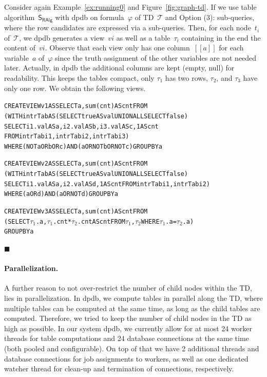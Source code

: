 \documentclass{llncs}
\newcommand{\cid}[1]{\ensuremath{[\![#1]\!]}}
\newcommand{\dpdb}{{\small\textsf{dpdb}}\xspace}
\newcommand{\tab}[1]{\ensuremath{\tau_{#1}}}
\renewenvironment{example}{\begin{EXa}}{\hfill\ensuremath{\blacksquare}\end{EXa}}
\begin{document}
\begin{example}\label{ex:dbviews}
Consider again Example~\ref{ex:running0} and Figure~\ref{fig:graph-td}.
If we use table algorithm~$\mathsf{S_{RAlg}}$ with \dpdb on formula~$\varphi$ of TD~$\mathcal{T}$ and Option (3): sub-queries, where the row candidates are expressed via a sub-queries. Then, for each node~$t_i$ of~$\mathcal{T}$, we \dpdb generates a view~$vi$ 
as well as a table~$\tab{i}$ containing in the end the content of~$vi$.
Observe that each view only has one column~$\cid{a}$ for each variable~$a$ of~$\varphi$ since the
truth assignment of the other variables are not needed later.
Actually, in \dpdb the additional columns are kept (empty, null) for readability.
This keeps the tables compact, only $\tab{1}$ has two rows, $\tab{2}$, and $\tab{3}$ have only one row.
We obtain the following views.
%
\begin{alltt}\small
CREATE VIEW v1 AS SELECT a, sum(cnt) AS cnt FROM 
 (WITH intrTab AS (SELECT true AS val UNION ALL SELECT false)
   SELECT i1.val AS a, i2.val AS b, i3.val AS c, 1 AS cnt 
          FROM intrTab i1, intrTab i2, intrTab i3)  
WHERE (NOT a OR b OR c) AND (a OR NOT b OR NOT c) GROUP BY a

CREATE VIEW v2 AS SELECT a, sum(cnt) AS cnt FROM 
 (WITH intrTab AS (SELECT true AS val UNION ALL SELECT false) 
   SELECT i1.val AS a, i2.val AS d, 1 AS cnt FROM intrTab i1, intrTab i2) 
WHERE (a OR d) AND (a OR NOT d) GROUP BY a

CREATE VIEW v3 AS SELECT a, sum(cnt) AS cnt FROM 
 (SELECT \ensuremath{\tab{1}}.a, \ensuremath{\tab{1}}.cnt * \ensuremath{\tab{2}}.cnt AS cnt FROM \ensuremath{\tab{1}}, \ensuremath{\tab{2}} WHERE \ensuremath{\tab{1}}.a = \ensuremath{\tab{2}}.a)
GROUP BY a\end{alltt}%
\vspace{-2em}
\end{example}%


\paragraph*{Parallelization.} A further reason to not over-restrict the number of child nodes within the TD, lies in parallelization.
In \dpdb, we compute tables in parallel along the TD,
where multiple tables can be computed at the same time,
as long as the child tables are computed.
Therefore, we tried to keep the number of child nodes in the TD as high as possible.
In our system \dpdb, we currently allow 
for at most 24 worker threads for table computations and 24 database connections at the same time (both pooled and configurable).
On top of that we have 2 additional threads and database connections for job assignments to workers, as well as one dedicated watcher thread for clean-up and termination of connections, respectively.
\end{document}

